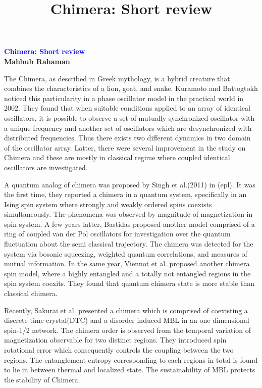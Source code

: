 \documentclass[a4paper,11pt]{article}
\title{Chimera: Short review}
\newcommand{\blue}[1]{\textcolor{blue}{#1}}
\begin{document}
\begin{center}
	{\large\bf \blue{Chimera: Short review}}\\
	{\tiny \bf Mahbub Rahaman}
\end{center}

The Chimera, as described in Greek mythology, is a hybrid creature that combines the characteristics of a lion, goat, and snake.  Kuramoto and Battogtokh noticed this particularity in a phase oscillator model\cite{kuramoto_coexistence_2002} in the practical world in 2002. They found that when suitable conditions applied to an array of identical oscillators, it is possible to observe a set of mutually synchronized oscillator with a unique frequency and another set of oscillators which are desynchronized with distributed frequencies. Thus there exists two different dynamics in two domain of the oscillator array.
Latter, there were several improvement in the study on Chimera and these are mostly in classical regime where coupled identical oscillators are investigated.

A quantum analog of chimera was proposed by Singh et al.(2011) in (epl)\cite{singh_chimera_2011}. It was the first time, they reported a chimera in a quantum system, specifically in an Ising spin system where strongly and weakly ordered spins coexists simultaneously. The phenomena was observed by magnitude of magnetization in spin system. A few years latter, Bastidas proposed another model comprised of a ring of coupled van der Pol oscillators for investigation over the quantum fluctuation about the semi classical trajectory\cite{bastidas_quantum_2015}. The chimera was detected for the system via  bosonic squeezing, weighted quantum correlations, and measures of mutual information. In the same year, Viennot et al. proposed another chimera spin model\cite{VIENNOT2016678}, where a highly entangled and a totally not entangled regions in the spin system coexits. They found that quantum chimera state is more stable than classical chimera. 

Recently, Sakurai et al. presented a chimera which is comprised of coexisting a discrete time crystal(DTC) and a disorder induced MBL in an one dimensional spin-1/2 network\cite{sakurai_chimera}. The chimera order is observed from the temporal variation of magnetization observable for two distinct regions. They introduced spin rotational error which consequently controls the coupling between the two regions. The entanglement entropy corresponding to each regions in total is found to lie in between thermal and localized state. The sustainability of MBL protects the stability of Chimera.
\end{document}
